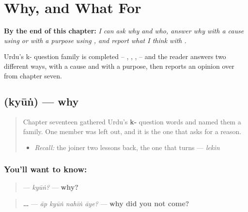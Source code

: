 
\chapter{Why, and What For}
\label{ch:ur-why-and-what-for}

\begin{chapteropening}
\textbf{By the end of this chapter:} \emph{I can ask why and who, answer why with a cause using  or with a purpose using  , and report what I think with .}

Urdu's k- question family is completed -- , , ,  -- and the reader answers  two different ways, with a cause and with a purpose, then reports an opinion over  from chapter seven.
\end{chapteropening}

\section[\texorpdfstring{\ur{کیوں؟} (kyūṅ?)}{کیوں؟ (kyūṅ?)}]{ (kyūṅ) — why}

\label{lesson:UR-C21-kyun}



\begin{quote}
Chapter seventeen gathered Urdu's \textbf{k-} question words and named them a family. One member was left out, and it is the one that asks for a reason.

\begin{itemize}
\raggedright
  \item \emph{Recall:} the joiner two lessons back, the one that turns — \emph{lekin}
\end{itemize}
\end{quote}

\subsection*{You'll want to know: }
\begin{quote}
\textbf{} — \emph{kyūṅ?} — \textbf{why?}
\end{quote}

\begin{quote}
\textbf{   …} — \emph{āp kyūṅ nahīṅ āye?} — \textbf{why did you not come?}
\end{quote}

